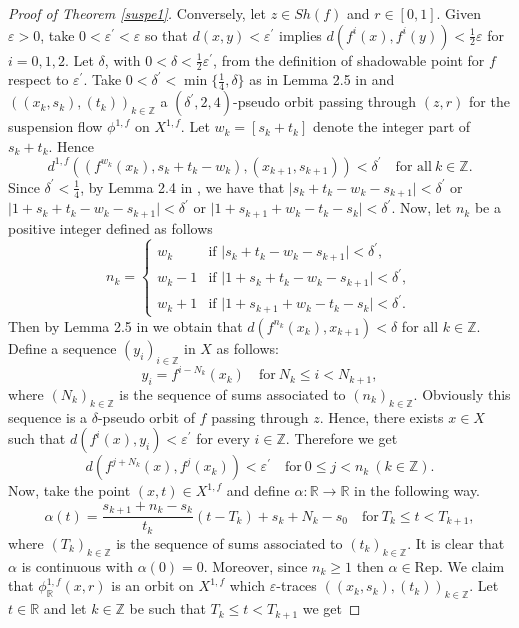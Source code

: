 \documentclass{amsart}
\theoremstyle{definition}
\newcommand{\ep}{\varepsilon}
\begin{document}
\begin{proof}[Proof of Theorem \ref{suspe1}]
	Conversely, let $z\in Sh(f)$ and $r\in [0,1]$. Given $\ep>0$, take $0<\ep^{\prime}<\ep$ so that $d(x,y)<\ep^{\prime}$ implies $d(f^{i}(x),f^{i}(y))<\tfrac{1}{2}\ep$ for $i=0,1,2$. Let $\delta$, with $0<\delta<\tfrac{1}{2}\ep^{\prime}$, from the definition of shadowable point for $f$ respect to $\ep^{\prime}$. Take $0<\delta^{\prime}<\min\{\tfrac{1}{4},\delta\}$ as in Lemma 2.5 in \cite{Thomas84} and $((x_k,s_k),(t_k))_{k\in\mathbb{Z}}$ a $(\delta^{\prime},2,4)$-pseudo orbit passing through $(z,r)$ for the suspension flow $\phi^{1,f}$ on $X^{1,f}$. Let $w_k=[s_k+t_k]$ denote the integer part of $s_k+t_k$. Hence
	$$d^{1,f}((f^{w_k}(x_k),s_k+t_k-w_k), (x_{k+1},s_{k+1}))<\delta^{\prime}\quad \mbox{for all}\ k\in \mathbb{Z}.$$
	Since $\delta^{\prime}<\tfrac{1}{4}$, by Lemma 2.4 in \cite{Thomas84}, we have that $\vert s_k+t_k-w_k-s_{k+1}\vert<\delta^{\prime}$ or $\vert 1+s_k+t_k-w_k-s_{k+1}\vert<\delta^{\prime}$ or $\vert 1+s_{k+1}+w_k-t_k-s_{k}\vert<\delta^{\prime}$. Now, let $n_k$ be a positive integer defined as follows 
	$$
	n_k = \left\{
	\begin{array}{cl}
	w_k &\mbox{if } \vert s_k+t_k-w_k-s_{k+1}\vert<\delta^{\prime},\\
	w_k-1 &\mbox{if } \vert 1+s_k+t_k-w_k-s_{k+1}\vert<\delta^{\prime},\\
	w_k+1 &\mbox{if } \vert 1+s_{k+1}+w_k-t_k-s_{k}\vert<\delta^{\prime}.
	\end{array}\right.
	$$
	Then by Lemma 2.5 in \cite{Thomas84} we obtain that $d(f^{n_k}(x_k),x_{k+1})<\delta$ for all $k\in \mathbb{Z}$. Define a sequence $(y_i)_{i\in\mathbb{Z}}$ in $X$ as follows:
	$$ y_i=f^{i-N_k}(x_k)\quad \mbox{for}\ N_k\leq i<N_{k+1},
	$$
	where $(N_k)_{k\in \mathbb{Z}}$ is the sequence of sums associated to $(n_k)_{k\in \mathbb{Z}}$. Obviously this sequence is a $\delta$-pseudo orbit of $f$ passing through $z$. Hence, there exists $x\in X$ such that $d(f^i(x),y_i)<\ep^{\prime}$ for every $i\in \mathbb{Z}$. Therefore we get 
	\begin{equation}\label{somb}
	d(f^{j+N_k}(x),f^{j}(x_k))<\ep^{\prime}\quad \mbox{for}\ 0\leq j<n_k\ (k\in \mathbb{Z}).
	\end{equation}
	Now, take the point $(x,t)\in X^{1,f}$ and define $\alpha:\mathbb{R}\rightarrow\mathbb{R}$ in the following way.
	$$\alpha(t)=\frac{s_{k+1}+n_k-s_k}{t_k}(t-T_k)+s_k+N_k-s_0\quad\mbox{for}\ T_k\leq t<T_{k+1},$$
	where $(T_k)_{k\in \mathbb{Z}}$ is the sequence of sums associated to $(t_k)_{k\in \mathbb{Z}}$. It is clear that $\alpha$ is continuous with $\alpha(0)=0$. Moreover, since $n_k\geq 1$ then $\alpha \in \mathrm{Rep}$. We claim that $\phi^{1,f}_{\mathbb{R}}(x,r)$ is an orbit on $X^{1,f}$ which $\ep$-traces $((x_k,s_k),(t_k))_{k\in\mathbb{Z}}$. Let $t\in \mathbb{R}$ and let $k\in\mathbb{Z}$ be such that $T_k\leq t<T_{k+1}$ we get

\end{proof}
\end{document}
